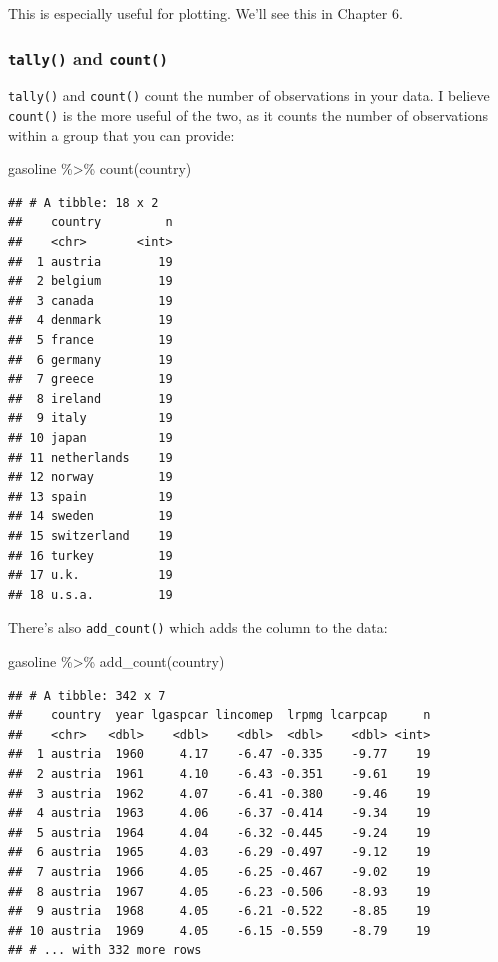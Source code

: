 \documentclass[
]{article}
\newenvironment{Shaded}{\begin{snugshade}}{\end{snugshade}}
\newcommand{\FunctionTok}[1]{\textcolor[rgb]{0.00,0.00,0.00}{#1}}
\newcommand{\NormalTok}[1]{#1}
\newcommand{\SpecialCharTok}[1]{\textcolor[rgb]{0.00,0.00,0.00}{#1}}
\begin{document}
This is especially useful for plotting. We'll see this in Chapter 6.

\hypertarget{tally-and-count}{%
\subsubsection{\texorpdfstring{\texttt{tally()} and \texttt{count()}}{tally() and count()}}\label{tally-and-count}}

\texttt{tally()} and \texttt{count()} count the number of observations in your data. I believe \texttt{count()} is the
more useful of the two, as it counts the number of observations within a group that you can provide:

\begin{Shaded}
\begin{Highlighting}[]
\NormalTok{gasoline }\SpecialCharTok{\%\textgreater{}\%}
  \FunctionTok{count}\NormalTok{(country)}
\end{Highlighting}
\end{Shaded}

\begin{verbatim}
## # A tibble: 18 x 2
##    country         n
##    <chr>       <int>
##  1 austria        19
##  2 belgium        19
##  3 canada         19
##  4 denmark        19
##  5 france         19
##  6 germany        19
##  7 greece         19
##  8 ireland        19
##  9 italy          19
## 10 japan          19
## 11 netherlands    19
## 12 norway         19
## 13 spain          19
## 14 sweden         19
## 15 switzerland    19
## 16 turkey         19
## 17 u.k.           19
## 18 u.s.a.         19
\end{verbatim}

There's also \texttt{add\_count()} which adds the column to the data:

\begin{Shaded}
\begin{Highlighting}[]
\NormalTok{gasoline }\SpecialCharTok{\%\textgreater{}\%}
  \FunctionTok{add\_count}\NormalTok{(country)}
\end{Highlighting}
\end{Shaded}

\begin{verbatim}
## # A tibble: 342 x 7
##    country  year lgaspcar lincomep  lrpmg lcarpcap     n
##    <chr>   <dbl>    <dbl>    <dbl>  <dbl>    <dbl> <int>
##  1 austria  1960     4.17    -6.47 -0.335    -9.77    19
##  2 austria  1961     4.10    -6.43 -0.351    -9.61    19
##  3 austria  1962     4.07    -6.41 -0.380    -9.46    19
##  4 austria  1963     4.06    -6.37 -0.414    -9.34    19
##  5 austria  1964     4.04    -6.32 -0.445    -9.24    19
##  6 austria  1965     4.03    -6.29 -0.497    -9.12    19
##  7 austria  1966     4.05    -6.25 -0.467    -9.02    19
##  8 austria  1967     4.05    -6.23 -0.506    -8.93    19
##  9 austria  1968     4.05    -6.21 -0.522    -8.85    19
## 10 austria  1969     4.05    -6.15 -0.559    -8.79    19
## # ... with 332 more rows
\end{verbatim}
\end{document}
